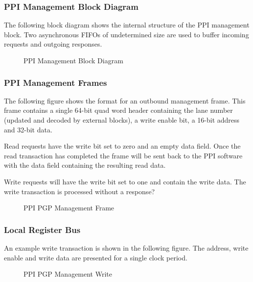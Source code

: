 \documentclass[11pt]{article}
\begin{document}
\subsubsection{PPI Management Block Diagram}

The following block diagram shows the internal structure of the PPI management block. Two asynchronous FIFOs
of undetermined size are used to buffer incoming requests and outgoing responses.

\begin{figure}[H]
   \centering
   \caption{PPI Management Block Diagram}
   \label{fig:ppi_mgmt_block}
\end{figure}

\subsubsection{PPI Management Frames}

The following figure shows the format for an outbound management frame. This frame contains a single 64-bit quad word header
containing the lane number (updated and decoded by external blocks), a write enable bit, a 16-bit address and 32-bit data.

Read requests have the write bit set to zero and an empty data field. Once the read transaction has completed the frame will be
sent back to the PPI software with the data field containing the resulting read data.

Write requests will have the write bit set to one and contain the write data. The write transaction is processed without a
response?

\begin{figure}[H]
   \centering
   \caption{PPI PGP Management Frame}
   \label{fig:ppi_mgmt_frame}
\end{figure}

\subsubsection{Local Register Bus}

An example write transaction is shown in the following figure. The address, write enable and write data are presented for a single clock
period.

\begin{figure}[H]
   \centering
   \caption{PPI PGP Management Write}
   \label{fig:ppi_mgmt_write}
\end{figure}
\end{document}
